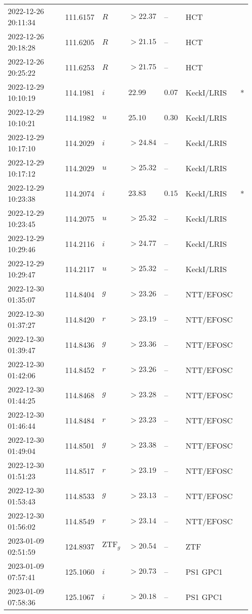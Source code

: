 \documentclass{nature_plusfigure}
\begin{document}
\begin{supplement}
\begin{center}
\begin{longtable}{lllllll}
2022-12-26 20:11:34 & 111.6157 & $R$ & $>22.37$ & -- & HCT &  \\ 
2022-12-26 20:18:28 & 111.6205 & $R$ & $>21.15$ & -- & HCT &  \\ 
2022-12-26 20:25:22 & 111.6253 & $R$ & $>21.75$ & -- & HCT &  \\ 
2022-12-29 10:10:19 & 114.1981 & $i$ & $22.99$ & $0.07$ & KeckI/LRIS & * \\ 
2022-12-29 10:10:21 & 114.1982 & $u$ & $25.10$ & $0.30$ & KeckI/LRIS &  \\ 
2022-12-29 10:17:10 & 114.2029 & $i$ & $>24.84$ & -- & KeckI/LRIS &  \\ 
2022-12-29 10:17:12 & 114.2029 & $u$ & $>25.32$ & -- & KeckI/LRIS &  \\ 
2022-12-29 10:23:38 & 114.2074 & $i$ & $23.83$ & $0.15$ & KeckI/LRIS & * \\ 
2022-12-29 10:23:45 & 114.2075 & $u$ & $>25.32$ & -- & KeckI/LRIS &  \\ 
2022-12-29 10:29:46 & 114.2116 & $i$ & $>24.77$ & -- & KeckI/LRIS &  \\ 
2022-12-29 10:29:47 & 114.2117 & $u$ & $>25.32$ & -- & KeckI/LRIS &  \\ 
2022-12-30 01:35:07 & 114.8404 & $g$ & $>23.26$ & -- & NTT/EFOSC &  \\ 
2022-12-30 01:37:27 & 114.8420 & $r$ & $>23.19$ & -- & NTT/EFOSC &  \\ 
2022-12-30 01:39:47 & 114.8436 & $g$ & $>23.36$ & -- & NTT/EFOSC &  \\ 
2022-12-30 01:42:06 & 114.8452 & $r$ & $>23.26$ & -- & NTT/EFOSC &  \\ 
2022-12-30 01:44:25 & 114.8468 & $g$ & $>23.28$ & -- & NTT/EFOSC &  \\ 
2022-12-30 01:46:44 & 114.8484 & $r$ & $>23.23$ & -- & NTT/EFOSC &  \\ 
2022-12-30 01:49:04 & 114.8501 & $g$ & $>23.38$ & -- & NTT/EFOSC &  \\ 
2022-12-30 01:51:23 & 114.8517 & $r$ & $>23.19$ & -- & NTT/EFOSC &  \\ 
2022-12-30 01:53:43 & 114.8533 & $g$ & $>23.13$ & -- & NTT/EFOSC &  \\ 
2022-12-30 01:56:02 & 114.8549 & $r$ & $>23.14$ & -- & NTT/EFOSC &  \\ 
2023-01-09 02:51:59 & 124.8937 & $\mathrm{ZTF}_{g}$ & $>20.54$ & -- & ZTF &  \\ 
2023-01-09 07:57:41 & 125.1060 & $i$ & $>20.73$ & -- & PS1 GPC1 &  \\ 
2023-01-09 07:58:36 & 125.1067 & $i$ & $>20.18$ & -- & PS1 GPC1 &  \\ 

\end{longtable}
\end{center}
\end{supplement}
\end{document}
